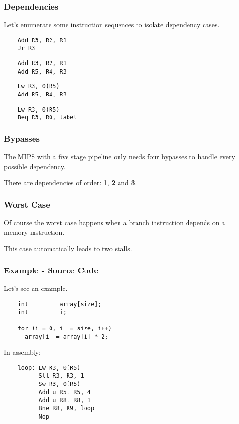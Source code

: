 
\begin{frame}[containsverbatim]
  \frametitle{Dependencies}

  Let's enumerate some instruction sequences to isolate dependency
  cases.

  \begin{verbatim}
    Add R3, R2, R1
    Jr R3
  \end{verbatim}

  \begin{verbatim}
    Add R3, R2, R1
    Add R5, R4, R3
  \end{verbatim}

  \begin{verbatim}
    Lw R3, 0(R5)
    Add R5, R4, R3
  \end{verbatim}

  \begin{verbatim}
    Lw R3, 0(R5)
    Beq R3, R0, label
  \end{verbatim}
\end{frame}


\begin{frame}
  \frametitle{Bypasses}

  The MIPS with a five stage pipeline only needs four bypasses to
  handle every possible dependency.

  \nl

  There are dependencies of order: \textbf{1}, \textbf{2} and \textbf{3}.

  \begin{center}
  \end{center}
\end{frame}


\begin{frame}
  \frametitle{Worst Case}

  Of course the worst case happens when a branch instruction depends on
  a memory instruction.

  \nl

  This case automatically leads to two stalls.
\end{frame}


\begin{frame}[containsverbatim]
  \frametitle{Example - Source Code}

  Let's see an example.

  \begin{verbatim}
    int         array[size];
    int         i;

    for (i = 0; i != size; i++)
      array[i] = array[i] * 2;
  \end{verbatim}

  In assembly:

  \begin{verbatim}
    loop: Lw R3, 0(R5)
          Sll R3, R3, 1
          Sw R3, 0(R5)
          Addiu R5, R5, 4
          Addiu R8, R8, 1
          Bne R8, R9, loop
          Nop
  \end{verbatim}
\end{frame}

